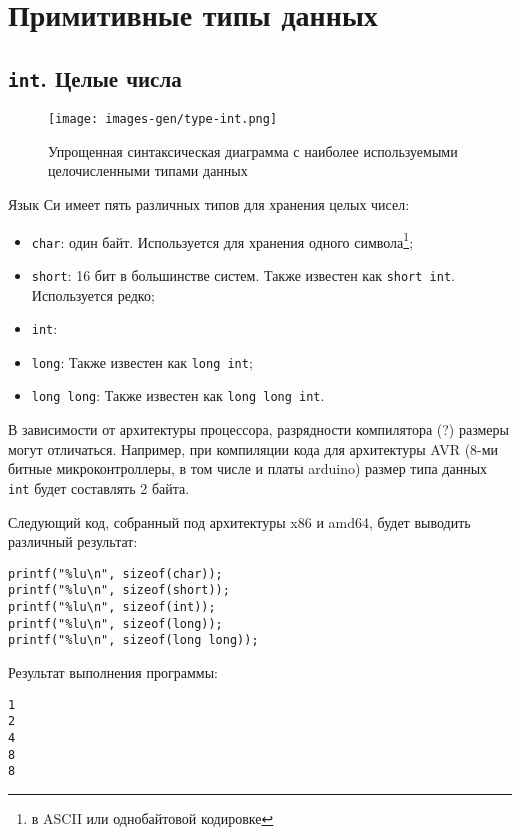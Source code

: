 \documentclass[myc.tex]{subfiles}
\begin{document}
\chapter{Примитивные типы данных}

\section{\texttt{int}. Целые числа}

\begin{figure}[th]
\centering
\texttt{[image: images-gen/type-int.png]}
\caption{Упрощенная синтаксическая диаграмма с наиболее используемыми целочисленными типами данных}
\label{fig:type-int}
\end{figure}

Язык Си имеет пять различных типов для хранения целых чисел:

\begin{itemize}
\item \texttt{char}: один байт. Используется для хранения одного символа\footnote{в ASCII или однобайтовой кодировке};
\item \texttt{short}: 16 бит в большинстве систем. Также известен как \texttt{short int}. Используется редко;
\item \texttt{int}: 
\item \texttt{long}: Также известен как \texttt{long int};
\item \texttt{long long}: Также известен как \texttt{long long int}.
\end{itemize}

В зависимости от архитектуры процессора, разрядности компилятора (?) размеры могут отличаться. Например, при компиляции кода для архитектуры AVR (8-ми битные микроконтроллеры, в том числе и платы arduino) размер типа данных \texttt{int} будет составлять 2 байта.

Следующий код, собранный под архитектуры x86 и amd64, будет выводить различный результат:%
\begin{lstlisting}
printf("%lu\n", sizeof(char));
printf("%lu\n", sizeof(short));
printf("%lu\n", sizeof(int));
printf("%lu\n", sizeof(long));
printf("%lu\n", sizeof(long long));
\end{lstlisting}
Результат выполнения программы:
\begin{verbatim}
1
2
4
8
8
\end{verbatim} 
\end{document}
